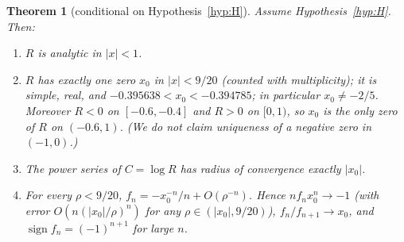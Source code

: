 \documentclass[11pt]{article}
\newtheorem{theorem}{Theorem}
\theoremstyle{definition}
\theoremstyle{remark}
\begin{document}
\begin{theorem}[conditional on Hypothesis~\ref{hyp:H}]\label{thm:C}
Assume Hypothesis~\ref{hyp:H}. Then:
\begin{enumerate}
\item $R$ is analytic in $|x|<1$.
\item $R$ has exactly one zero $x_0$ in $|x|<9/20$ (counted with multiplicity); it is simple, real, and $-0.395638<x_0<-0.394785$; in particular $x_0\ne-2/5$. Moreover $R<0$ on $[-0.6,-0.4]$ and $R>0$ on $[0,1)$,
  so $x_0$ is the only zero of $R$ on $(-0.6,1)$. (We do \emph{not} claim uniqueness of a negative zero in $(-1,0)$.)
\item The power series of $C=\log R$ has radius of convergence exactly $|x_0|$.
\item For every $\rho<9/20$, $f_n=-x_0^{-n}/n+O(\rho^{-n})$. Hence $nf_nx_0^n\to-1$ (with error $O(n(|x_0|/\rho)^n)$ for any $\rho\in(|x_0|,9/20)$), $f_n/f_{n+1}\to x_0$, and $\operatorname{sign}f_n=(-1)^{n+1}$ for large $n$.
\end{enumerate}
\end{theorem}
\end{document}
